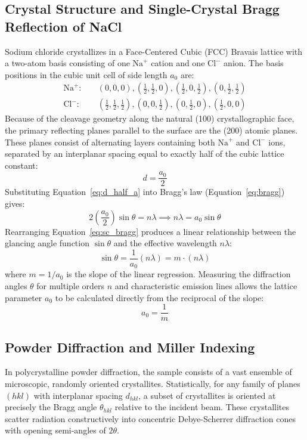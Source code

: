 \documentclass[12pt,a4paper]{article}
\begin{document}
\subsection{Crystal Structure and Single-Crystal Bragg Reflection of NaCl}
Sodium chloride crystallizes in a Face-Centered Cubic (FCC) Bravais lattice with a two-atom basis consisting of one $\text{Na}^+$ cation and one $\text{Cl}^-$ anion. The basis positions in the cubic unit cell of side length $a_0$ are:
\begin{align}
    \text{Na}^+: &\quad (0,0,0), \left(\frac{1}{2}, \frac{1}{2}, 0\right), \left(\frac{1}{2}, 0, \frac{1}{2}\right), \left(0, \frac{1}{2}, \frac{1}{2}\right) \\
    \text{Cl}^-: &\quad \left(\frac{1}{2}, \frac{1}{2}, \frac{1}{2}\right), \left(0, 0, \frac{1}{2}\right), \left(0, \frac{1}{2}, 0\right), \left(\frac{1}{2}, 0, 0\right)
\end{align}
Because of the cleavage geometry along the natural (100) crystallographic face, the primary reflecting planes parallel to the surface are the (200) atomic planes. These planes consist of alternating layers containing both $\text{Na}^+$ and $\text{Cl}^-$ ions, separated by an interplanar spacing equal to exactly half of the cubic lattice constant:
\begin{equation}
    d = \frac{a_0}{2}
    \label{eq:d_half_a}
\end{equation}
Substituting Equation~\eqref{eq:d_half_a} into Bragg's law (Equation~\eqref{eq:bragg}) gives:
\begin{equation}
    2\left(\frac{a_0}{2}\right)\sin\theta = n\lambda \implies n\lambda = a_0 \sin\theta
    \label{eq:sc_bragg}
\end{equation}
Rearranging Equation~\eqref{eq:sc_bragg} produces a linear relationship between the glancing angle function $\sin\theta$ and the effective wavelength $n\lambda$:
\begin{equation}
    \sin\theta = \frac{1}{a_0}(n\lambda) = m \cdot (n\lambda)
    \label{eq:sc_linear}
\end{equation}
where $m = 1/a_0$ is the slope of the linear regression. Measuring the diffraction angles $\theta$ for multiple orders $n$ and characteristic emission lines allows the lattice parameter $a_0$ to be calculated directly from the reciprocal of the slope:
\begin{equation}
    a_0 = \frac{1}{m}
\end{equation}

\subsection{Powder Diffraction and Miller Indexing}
In polycrystalline powder diffraction, the sample consists of a vast ensemble of microscopic, randomly oriented crystallites. Statistically, for any family of planes $(hkl)$ with interplanar spacing $d_{hkl}$, a subset of crystallites is oriented at precisely the Bragg angle $\theta_{hkl}$ relative to the incident beam. These crystallites scatter radiation constructively into concentric Debye-Scherrer diffraction cones with opening semi-angles of $2\theta$.
\end{document}
